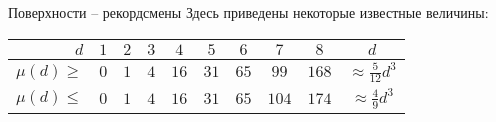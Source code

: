 \begin{surferIntroPage}{Поверхности – рекордсмены}
Здесь приведены некоторые известные величины:
    \begin{center}
      \begin{tabular}{r|cccccccc|c}
        $d$ & $1$ & $2$ & $3$ & $4$ & $5$ & $6$ & $7$ & $8$ & $d$\\
        \hline
        \hline
        \rule{0pt}{1.2em}$\mu(d)\ge$ & $0$ & $1$ & $4$ & $16$ & $31$ & $65$ &
        $99$ & $168$ & 
        $\approx \frac{5}{12}d^3$\\[0.3em]
        \hline
        \rule{0pt}{1.2em}$\mu(d)\le$ & $0$ & $1$ & $4$ & $16$ & $31$ & $65$ &
        $104$ & $174$ & $\approx \frac{4}{9}d^3$
      \end{tabular}
    \end{center}
\end{surferIntroPage}

